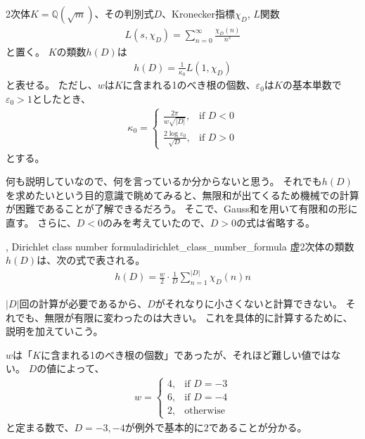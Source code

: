 \begin{Theo}{}{}
2次体$K=\mathbb{Q}(\sqrt{m})$、その判別式$D$、Kronecker指標$\chi_D$, $L$関数
\begin{align*}
L(s, \chi_D) = \sum_{n=0}^{\infty}\frac{\chi_D(n)}{n^s}
\end{align*}
と置く。
$K$の類数$h(D)$は
\begin{align*}
h(D) = \frac{1}{\kappa_0}L(1, \chi_D)
\end{align*}
と表せる。
ただし、$w$は$K$に含まれる1のべき根の個数、$\varepsilon_0$は$K$の基本単数で$\varepsilon_0>1$としたとき、
\begin{align*}
\kappa_0 = 
\begin{cases}
\frac{2\pi}{w\sqrt{|D|}}, & \mbox{if } D < 0\\
\frac{2 \log{\varepsilon_0}}{\sqrt{D}}, & \mbox{if } D > 0
\end{cases}
\end{align*}
とする。
\end{Theo}

何も説明していなので、何を言っているか分からないと思う。
それでも$h(D)$を求めたいという目的意識で眺めてみると、無限和が出てくるため機械での計算が困難であることが了解できるだろう。
そこで、Gauss和を用いて有限和の形に直す。
さらに、$D<0$のみを考えていたので、$D>0$の式は省略する。

\begin{Theo}{, Dirichlet class number formula}{dirichlet_class_number_formula}
虚2次体の類数$h(D)$は、次の式で表される。
\begin{align*}
h(D) = \frac{w}{2}\cdot\frac{1}{D}\sum_{n=1}^{|D|}\chi_D(n)n
\end{align*}
\end{Theo}

$|D|$回の計算が必要であるから、$D$がそれなりに小さくないと計算できない。
それでも、無限が有限に変わったのは大きい。
これを具体的に計算するために、説明を加えていこう。

$w$は「$K$に含まれる1のべき根の個数」であったが、それほど難しい値ではない。
$D$の値によって、
\begin{align*}
w = 
\begin{cases}
4, & \mbox{if } D = -3\\
6, & \mbox{if } D = -4\\
2, & \mbox{otherwise}
\end{cases}
\end{align*}
と定まる数で、$D=-3,-4$が例外で基本的に$2$であることが分かる。


